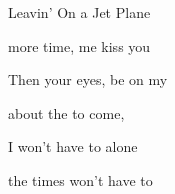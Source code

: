 \begin{SBSong}{Leavin' On a Jet Plane}
\begin{SBVerse}
     more time,  me kiss you
    
    Then  your eyes,  be on my   
    
     about the  to come, 
    
     I won't have to  alone
    
     the times  won't have to   
  \end{SBVerse}
\end{SBSong}

